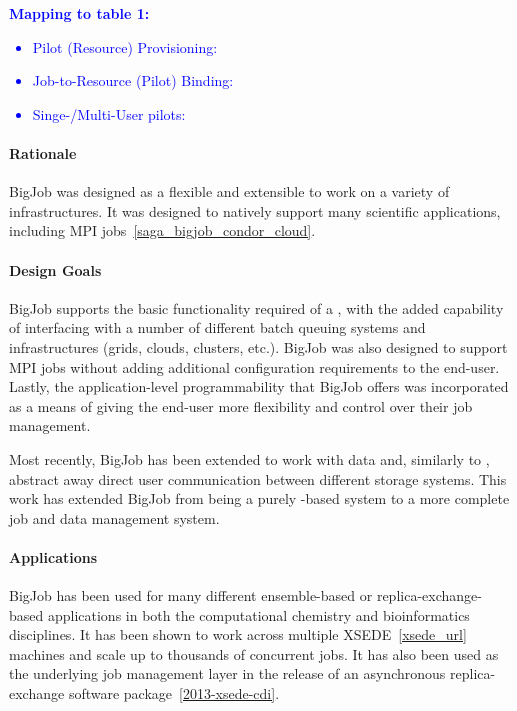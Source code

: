 \documentclass{sig-alternate}
\begin{document}
\textcolor{blue}
{
\textbf{Mapping to table 1:}
\begin{itemize}
\item Pilot (Resource) Provisioning:
\item Job-to-Resource (Pilot) Binding:
\item Singe-/Multi-User pilots:
\end{itemize}
}

\paragraph{Rationale}
BigJob was designed as a flexible and extensible \pilotjob
to work on a variety of infrastructures. It was designed to
natively support many scientific applications, including
MPI jobs~\ref{saga_bigjob_condor_cloud}.

\paragraph{Design Goals}
BigJob supports the basic functionality required of a \pilotjob,
with the added capability of interfacing with a number of
different batch queuing systems and infrastructures (grids,
clouds, clusters, etc.). BigJob was also designed to
support MPI jobs without adding additional configuration
requirements to the end-user. Lastly, the application-level
programmability that BigJob offers was incorporated as a
means of giving the end-user more flexibility and control
over their job management.

Most recently, BigJob has been extended to work with data and, similarly to
\pilotjobs, abstract away direct user communication between different
storage systems. This work has extended BigJob from being a purely
\pilotjob-based system to a more complete job and data management
system.

\paragraph{Applications}
BigJob has been used for many different ensemble-based or
replica-exchange-based applications in both the computational chemistry
and bioinformatics disciplines. It has been shown to work across multiple
XSEDE~\ref{xsede_url} machines and scale up to thousands of concurrent
jobs. It has also been used as the underlying job
management layer in the release of an asynchronous replica-exchange
software package~\ref{2013-xsede-cdi}.
\end{document}
